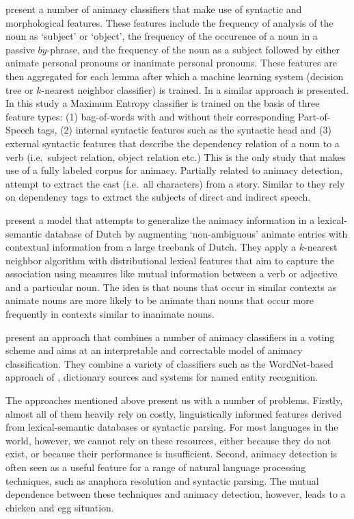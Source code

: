 \documentclass[a4paper,UKenglish]{oasics}
\begin{document}
\cite{ovrelid:04,ovrelid:05,ovrelid:06,ovrelid:08,ovrelid:09} present
a number of animacy classifiers that make use of syntactic and
morphological features. These features include the frequency of
analysis of the noun as `subject' or `object', the frequency of the
occurence of a noun in a passive $by$-phrase, and the frequency of the
noun as a subject followed by either animate personal pronouns or
inanimate personal pronouns. These features are then aggregated for
each lemma after which a machine learning system (decision tree or
$k$-nearest neighbor classifier) is trained. In \cite{bowman:12} a
similar approach is presented. In this study a Maximum Entropy
classifier is trained on the basis of three feature types: (1)
bag-of-words with and without their corresponding Part-of-Speech tags,
(2) internal syntactic features such as the syntactic head and (3)
external syntactic features that describe the dependency relation of a
noun to a verb (i.e.\ subject relation, object relation etc.)  This is
the only study that makes use of a fully labeled corpus for animacy.
Partially related to animacy detection, \cite{karsdorp:12}
attempt to extract the cast (i.e.\ all characters) from a
story. Similar to \cite{bowman:12} they rely on dependency tags to
extract the subjects of direct and indirect speech.

\cite{bloem:13} present a model that attempts to generalize the
animacy information in a lexical-semantic database of Dutch by
augmenting `non-ambiguous' animate entries with contextual information
from a large treebank of Dutch. They apply a $k$-nearest neighbor
algorithm with distributional lexical features that aim to capture the
association using measures like mutual information between a verb or
adjective and a particular noun. The idea is that nouns that occur in
similar contexts as animate nouns are more likely to be animate than
nouns that occur more frequently in contexts similar to inanimate nouns.

\cite{moore:13} present an approach that combines a number of animacy
classifiers in a voting scheme and aims at an interpretable and
correctable model of animacy classification. They combine a variety of
classifiers such as the WordNet-based approach of \cite{evans:00},
dictionary sources and systems for named entity recognition.

The approaches mentioned above present us with a number of
problems. Firstly, almost all of them heavily rely on costly,
linguistically informed features derived from lexical-semantic
databases or syntactic parsing. For most languages in the world,
however, we cannot rely on these resources, either because they do not
exist, or because their performance is insufficient.  Second, animacy
detection is often seen as a useful feature for a range of natural
language processing techniques, such as anaphora resolution and
syntactic parsing. The mutual dependence between these techniques and
animacy detection, however, leads to a chicken and egg
situation.
\end{document}
